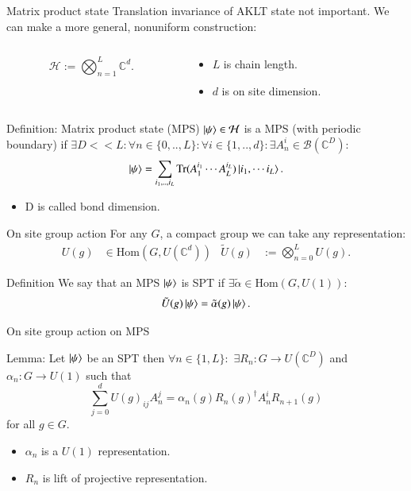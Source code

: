 \documentclass{beamer}
\newcommand{\HH}{\mathcal{H}}
\newcommand{\CC}{\mathbb{C}}
\newcommand{\BB}{\mathcal{B}}
\newcommand{\Tr}{\mathrm{Tr}}
\begin{document}
\begin{frame}{Matrix product state}
Translation invariance of AKLT state not important. We can make a more general, nonuniform construction:
\begin{columns}
\begin{column}{0.5\textwidth}
\[\HH := \bigotimes_{n=1}^{L}\CC^{d}.\]
\end{column}
\begin{column}{0.5\textwidth}
\begin{itemize}
\item $L$ is chain length.
\item $d$ is on site dimension.
\end{itemize}
\end{column}
\end{columns}
\pause
\begin{block}{Definition: Matrix product state (MPS)}
$\ket{\psi}\in\HH$ is a MPS (with periodic boundary) if $\exists D<<L:\forall n\in\{0,..,L\}:\forall i\in\{1,..,d\}:\exists A^i_n\in\BB(\CC^D):$
\begin{equation}
\ket{\psi}=\sum_{i_1,..,i_L}\Tr(A^{i_1}_1\cdots A^{i_L}_L)\ket{i_1,\cdots i_L}.
\end{equation}
\end{block}
\pause
\begin{itemize}
\item D is called bond dimension.
\end{itemize}
\end{frame}

\begin{frame}{On site group action}
For any $G$, a compact group we can take any representation:
\begin{align}
U(g)&\in\textrm{Hom}(G,U(\CC^d))&\tilde U(g)&:= \bigotimes_{n=0}^L U(g).
\end{align}
\pause
\begin{block}{Definition}
We say that an MPS $\ket{\psi}$ is SPT if $\exists \tilde{\alpha}\in\textrm{Hom}(G,U(1)):$
\[\tilde{U}(g)\ket{\psi}=\tilde{\alpha}(g)\ket{\psi}.\]
\end{block}
\end{frame}

\begin{frame}{On site group action on MPS}
\begin{block}{Lemma:}
Let $\ket{\psi}$ be an SPT then $\forall n\in\{1,L\}:$ $\exists R_n:G\rightarrow U(\CC^D)$ and $\alpha_n:G\rightarrow U(1)$ such that
\begin{equation}
\sum_{j=0}^{d}U(g)_{ij}A^j_n=\alpha_n(g) R_n(g)^\dagger A^i_n R_{n+1}(g)
\end{equation}
for all $g\in G.$
\end{block}
\pause
\begin{itemize}
\item $\alpha_n$ is a $U(1)$ representation.
\item $R_n$ is lift of projective representation.
\end{itemize}
\end{frame}
\end{document}
